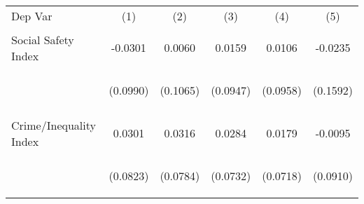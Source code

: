 \begin{center}
\begin{tabular}{lccccc}
\hline \noalign{\smallskip}Dep Var & (1) & (2) & (3) & (4) & (5)\\
\noalign{\smallskip}\hline \noalign{\smallskip}Social Safety Index & \begin{scriptsize}-0.0301\end{scriptsize} & \begin{scriptsize}0.0060\end{scriptsize} & \begin{scriptsize}0.0159\end{scriptsize} & \begin{scriptsize}0.0106\end{scriptsize} & \begin{scriptsize}-0.0235\end{scriptsize}\\
 & \begin{scriptsize}(0.0990)\end{scriptsize} & \begin{scriptsize}(0.1065)\end{scriptsize} & \begin{scriptsize}(0.0947)\end{scriptsize} & \begin{scriptsize}(0.0958)\end{scriptsize} & \begin{scriptsize}(0.1592)\end{scriptsize}\\
\noalign{\smallskip}Crime/Inequality Index & \begin{scriptsize}0.0301\end{scriptsize} & \begin{scriptsize}0.0316\end{scriptsize} & \begin{scriptsize}0.0284\end{scriptsize} & \begin{scriptsize}0.0179\end{scriptsize} & \begin{scriptsize}-0.0095\end{scriptsize}\\
 & \begin{scriptsize}(0.0823)\end{scriptsize} & \begin{scriptsize}(0.0784)\end{scriptsize} & \begin{scriptsize}(0.0732)\end{scriptsize} & \begin{scriptsize}(0.0718)\end{scriptsize} & \begin{scriptsize}(0.0910)\end{scriptsize}\\

\end{tabular}
\end{center}
